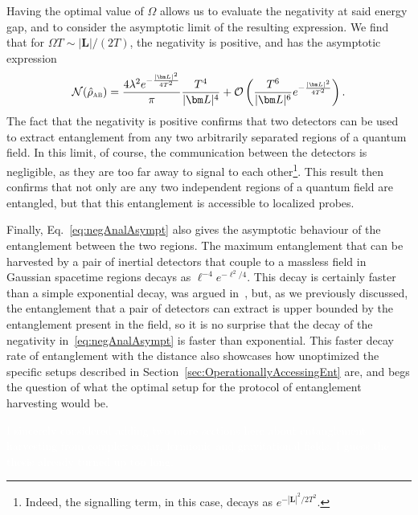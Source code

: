 \documentclass[letterpaper,12pt,titlepage,oneside,final]{book}
\newcommand{\tc}[1]{\textsc{#1}}
\begin{document}
Having the optimal value of $\Omega$ allows us to evaluate the negativity at said energy gap, and to consider the asymptotic limit of the resulting expression. We find that for $\Omega T \sim | \bm L|/(2T)$, the negativity is positive, and has the asymptotic expression
\begin{equation}\label{eq:negAnalAsympt}
    \mathcal{N}(\hat{\rho}_{\tc{ab}}) = \frac{4\lambda^2 e^{-\frac{|\bm L|^2}{4 T^2}}}{\pi }\frac{T^4}{|\bm L|^4} + \mathcal{O}\left(\frac{T^6}{|\bm L|^6}e^{-\frac{|\bm L|^2}{4 T^2}}\right).
\end{equation}
The fact that the negativity is positive confirms that two detectors can be used to extract entanglement from any two arbitrarily separated regions of a quantum field. In this limit, of course, the communication between the detectors is negligible, as they are too far away to signal to each other\footnote{Indeed, the signalling term, in this case, decays as $e^{- |\bm L|^2/2T^2}$.}. This result then confirms that not only are any two independent regions of a quantum field are entangled, but that this entanglement is accessible to localized probes.

Finally, Eq.~\eqref{eq:negAnalAsympt} also gives the asymptotic behaviour of the entanglement between the two regions. The maximum entanglement that can be harvested by a pair of inertial detectors that couple to a massless field in Gaussian spacetime regions decays as $\ell^{-4}e^{-\ell^2/4}$. This decay is certainly faster than a simple exponential decay, was argued in~\cite{KlcoUVIR}, but, as we previously discussed, the entanglement that a pair of detectors can extract is upper bounded by the entanglement present in the field, so it is no surprise that the decay of the negativity in~\eqref{eq:negAnalAsympt} is faster than exponential. This faster decay rate of entanglement with the distance also showcases how unoptimized the specific setups described in Section~\ref{sec:OperationallyAccessingEnt} are, and begs the question of what the optimal setup for the protocol of entanglement harvesting would be.

\textcolor{white}{I sincerely considered adding two more sections here about entanglement harvesting from complex scalar, fermionic and gravitational fields. I guess the thesis already turned up too long.}



%
\end{document}
